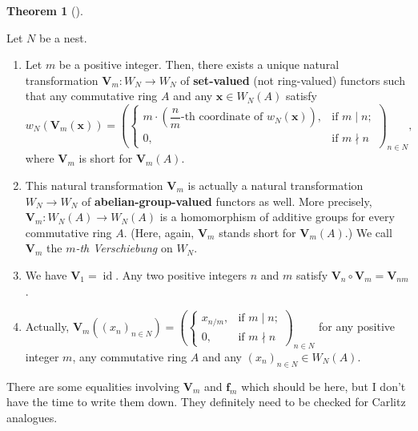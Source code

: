\documentclass[numbers=enddot,12pt,final,onecolumn,notitlepage]{scrartcl}%
\theoremstyle{definition}
\newtheorem{theo}{Theorem}[section]
\newenvironment{theorem}[1][]
{\begin{theo}[#1]\begin{leftbar}}
{\end{leftbar}\end{theo}}
\begin{document}
\begin{theorem}
\label{thm.Witt.ver}Let $N$ be a nest.

\begin{enumerate}
\item[\textbf{(a)}] Let $m$ be a positive integer. Then, there exists a unique
natural transformation $\mathbf{V}_{m}:W_{N}\rightarrow W_{N}$ of
\textbf{set-valued} (not ring-valued) functors such that any commutative ring
$A$ and any $\mathbf{x}\in W_{N}\left(  A\right)  $ satisfy%
\[
w_{N}\left(  \mathbf{V}_{m}\left(  \mathbf{x}\right)  \right)  =\left(
\begin{cases}
m\cdot\left(  \dfrac{n}{m}\text{-th coordinate of }w_{N}\left(  \mathbf{x}%
\right)  \right)  , & \text{if }m\mid n;\\
0, & \text{if }m\nmid n
\end{cases}
\right)  _{n\in N},
\]
where $\mathbf{V}_{m}$ is short for $\mathbf{V}_{m}\left(  A\right)  $.

\item[\textbf{(b)}] This natural transformation $\mathbf{V}_{m}$ is actually a
natural transformation $W_{N}\rightarrow W_{N}$ of
\textbf{abelian-group-valued} functors as well. More precisely, $\mathbf{V}%
_{m}:W_{N}\left(  A\right)  \rightarrow W_{N}\left(  A\right)  $ is a
homomorphism of additive groups for every commutative ring $A$. (Here, again,
$\mathbf{V}_{m}$ stands short for $\mathbf{V}_{m}\left(  A\right)  $.) We call
$\mathbf{V}_{m}$ the $m$\textit{-th Verschiebung} on $W_{N}$.

\item[\textbf{(c)}] We have $\mathbf{V}_{1}=\operatorname*{id}$. Any two
positive integers $n$ and $m$ satisfy $\mathbf{V}_{n}\circ\mathbf{V}%
_{m}=\mathbf{V}_{nm}$.

\item[\textbf{(d)}] Actually, $\mathbf{V}_{m}\left(  \left(  x_{n}\right)
_{n\in N}\right)  =\left(
\begin{cases}
x_{n/m}, & \text{if }m\mid n;\\
0, & \text{if }m\nmid n
\end{cases}
\right)  _{n\in N}$ for any positive integer $m$, any commutative ring $A$ and
any $\left(  x_{n}\right)  _{n\in N}\in W_{N}\left(  A\right)  $.
\end{enumerate}
\end{theorem}

There are some equalities involving $\mathbf{V}_{m}$ and $\mathbf{f}_{m}$
which should be here, but I don't have the time to write them down. They
definitely need to be checked for Carlitz analogues.
\end{document}
